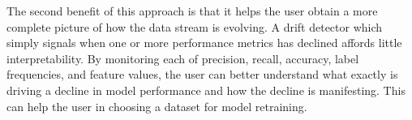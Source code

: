 The second benefit of this approach is that it helps the user obtain a more complete picture of how the data stream is evolving. A drift detector which simply signals when one or more performance metrics has declined affords little interpretability. By monitoring each of precision, recall, accuracy, label frequencies, and feature values, the user can better understand what exactly is driving a decline in model performance and how the decline is manifesting. This can help the user in choosing a dataset for model retraining. 

